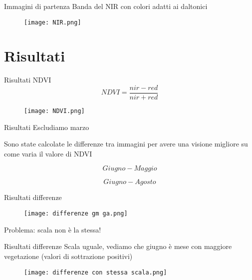 \documentclass{beamer} %
\begin{document}
\begin{frame}{Immagini di partenza}
Banda del NIR con colori adatti ai daltonici

\begin{figure}
    \centering
    \texttt{[image: NIR.png]}
    \label{fig:enter-label}
\end{figure}
\end{frame}

\section{Risultati}

\begin{frame}{Risultati NDVI}
\begin{equation}
        {NDVI}= \frac{nir-red}{nir+red}
    \end{equation} 
\begin{figure}
    \centering
    \texttt{[image: NDVI.png]}
    \label{fig:enter-label}
\end{figure}
\end{frame}



\begin{frame}{Risultati}
Escludiamo marzo \\

\bigskip

Sono state calcolate le differenze tra immagini per avere una visione migliore su come varia il valore di NDVI 

\begin{equation}
    Giugno - Maggio
\end{equation}

\begin{equation}
    Giugno - Agosto
\end{equation}

\end{frame}


\begin{frame}{Risultati differenze}
\begin{figure}
    \centering
    \texttt{[image: differenze gm ga.png]}

        \label{fig:enter-label}
\end{figure}

\centering
Problema: scala non è la stessa!
\end{frame}


\begin{frame}{Risultati differenze}
Scala uguale, vediamo che giugno è mese con maggiore vegetazione (valori di sottrazione positivi)
\begin{figure}
        \centering
        \texttt{[image: differenze con stessa scala.png]}
        \label{fig:enter-label}
    \end{figure}

\end{frame}
\end{document}
